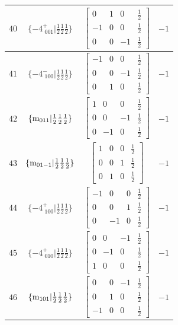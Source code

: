 \documentclass[fleqn,8pt]{jsarticle}
\begin{document}
\begin{longtable}{cccc}
$ 40 $ & $ \{-4^{+}_{\,\,001}|\frac{1}{2} \frac{1}{2} \frac{1}{2}\} $ & $ \begin{bmatrix} 0 & 1 & 0 & \frac{1}{2} \\ -1 & 0 & 0 & \frac{1}{2} \\ 0 & 0 & -1 & \frac{1}{2} \end{bmatrix} $ & $ -1 $ \\ \hline
$ 41 $ & $ \{-4^{-}_{\,\,100}|\frac{1}{2} \frac{1}{2} \frac{1}{2}\} $ & $ \begin{bmatrix} -1 & 0 & 0 & \frac{1}{2} \\ 0 & 0 & -1 & \frac{1}{2} \\ 0 & 1 & 0 & \frac{1}{2} \end{bmatrix} $ & $ -1 $ \\ \hline
$ 42 $ & $ \{{\rm m}_{011}|\frac{1}{2} \frac{1}{2} \frac{1}{2}\} $ & $ \begin{bmatrix} 1 & 0 & 0 & \frac{1}{2} \\ 0 & 0 & -1 & \frac{1}{2} \\ 0 & -1 & 0 & \frac{1}{2} \end{bmatrix} $ & $ -1 $ \\ \hline
$ 43 $ & $ \{{\rm m}_{01-1}|\frac{1}{2} \frac{1}{2} \frac{1}{2}\} $ & $ \begin{bmatrix} 1 & 0 & 0 & \frac{1}{2} \\ 0 & 0 & 1 & \frac{1}{2} \\ 0 & 1 & 0 & \frac{1}{2} \end{bmatrix} $ & $ -1 $ \\ \hline
$ 44 $ & $ \{-4^{+}_{\,\,100}|\frac{1}{2} \frac{1}{2} \frac{1}{2}\} $ & $ \begin{bmatrix} -1 & 0 & 0 & \frac{1}{2} \\ 0 & 0 & 1 & \frac{1}{2} \\ 0 & -1 & 0 & \frac{1}{2} \end{bmatrix} $ & $ -1 $ \\ \hline
$ 45 $ & $ \{-4^{+}_{\,\,010}|\frac{1}{2} \frac{1}{2} \frac{1}{2}\} $ & $ \begin{bmatrix} 0 & 0 & -1 & \frac{1}{2} \\ 0 & -1 & 0 & \frac{1}{2} \\ 1 & 0 & 0 & \frac{1}{2} \end{bmatrix} $ & $ -1 $ \\ \hline
$ 46 $ & $ \{{\rm m}_{101}|\frac{1}{2} \frac{1}{2} \frac{1}{2}\} $ & $ \begin{bmatrix} 0 & 0 & -1 & \frac{1}{2} \\ 0 & 1 & 0 & \frac{1}{2} \\ -1 & 0 & 0 & \frac{1}{2} \end{bmatrix} $ & $ -1 $ \\ \hline

\end{longtable}
\end{document}
